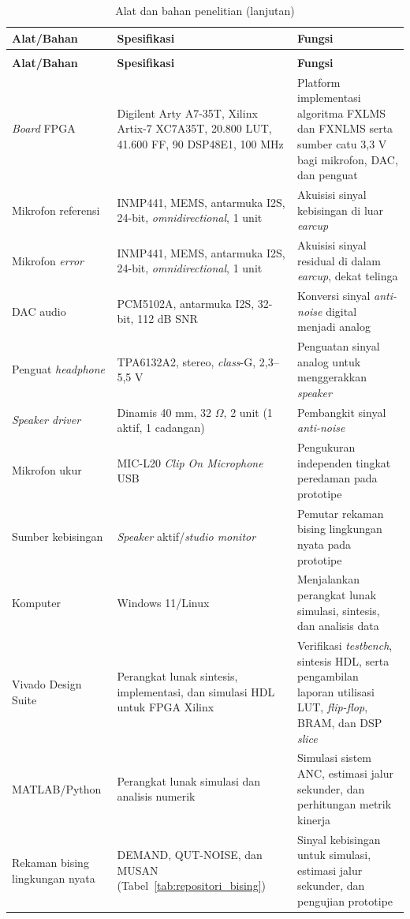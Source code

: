 \begingroup
\small
\renewcommand{\arraystretch}{1.3}
\begin{longtable}{|>{\raggedright\arraybackslash}p{3.4cm}|>{\raggedright\arraybackslash}p{5.6cm}|>{\raggedright\arraybackslash}p{5.2cm}|}
  \caption{Alat dan bahan penelitian}
  \label{tab:bahan_peralatan} \\
  \hline
  \textbf{Alat/Bahan} & \textbf{Spesifikasi} & \textbf{Fungsi} \\
  \hline
  \endfirsthead
  \caption[]{Alat dan bahan penelitian (lanjutan)} \\
  \hline
  \textbf{Alat/Bahan} & \textbf{Spesifikasi} & \textbf{Fungsi} \\
  \hline
  \endhead
  \emph{Board} FPGA & Digilent Arty A7-35T, Xilinx Artix-7 XC7A35T, 20.800 LUT, 41.600 FF, 90 DSP48E1, 100 MHz & Platform implementasi algoritma FXLMS dan FXNLMS serta sumber catu 3,3 V bagi mikrofon, DAC, dan penguat \\
  \hline
  Mikrofon referensi & INMP441, MEMS, antarmuka I2S, 24-bit, \emph{omnidirectional}, 1 unit & Akuisisi sinyal kebisingan di luar \emph{earcup} \\
  \hline
  Mikrofon \emph{error} & INMP441, MEMS, antarmuka I2S, 24-bit, \emph{omnidirectional}, 1 unit & Akuisisi sinyal residual di dalam \emph{earcup}, dekat telinga \\
  \hline
  DAC audio & PCM5102A, antarmuka I2S, 32-bit, 112 dB SNR & Konversi sinyal \emph{anti-noise} digital menjadi analog \\
  \hline
  Penguat \emph{headphone} & TPA6132A2, stereo, \emph{class}-G, 2,3--5,5 V & Penguatan sinyal analog untuk menggerakkan \emph{speaker} \\
  \hline
  \emph{Speaker driver} & Dinamis 40 mm, 32 $\Omega$, 2 unit (1 aktif, 1 cadangan) & Pembangkit sinyal \emph{anti-noise} \\
  \hline
  Mikrofon ukur & MIC-L20 \emph{Clip On Microphone} USB & Pengukuran independen tingkat peredaman pada prototipe \\
  \hline
  Sumber kebisingan & \emph{Speaker} aktif/\emph{studio monitor} & Pemutar rekaman bising lingkungan nyata pada prototipe \\
  \hline
  Komputer & Windows 11/Linux & Menjalankan perangkat lunak simulasi, sintesis, dan analisis data \\
  \hline
  Vivado Design Suite & Perangkat lunak sintesis, implementasi, dan simulasi HDL untuk FPGA Xilinx & Verifikasi \emph{testbench}, sintesis HDL, serta pengambilan laporan utilisasi LUT, \emph{flip-flop}, BRAM, dan DSP \emph{slice} \\
  \hline
  MATLAB/Python & Perangkat lunak simulasi dan analisis numerik & Simulasi sistem ANC, estimasi jalur sekunder, dan perhitungan metrik kinerja \\
  \hline
  Rekaman bising lingkungan nyata & DEMAND, QUT-NOISE, dan MUSAN (Tabel~\ref{tab:repositori_bising}) & Sinyal kebisingan untuk simulasi, estimasi jalur sekunder, dan pengujian prototipe \\
  \hline
\end{longtable}
\endgroup

